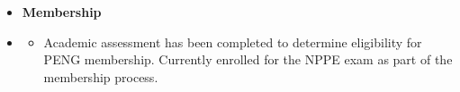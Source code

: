 \begin {itemize} \item [] {\bf \Large    Membership }  \vspace{-1.5em}
\item []  {\bf \hrulefill } \mdseries \normalsize 
    \begin {itemize}
        \item [$\bullet$]  {\normalsize Academic assessment has been completed to determine eligibility for PENG membership. Currently enrolled for the NPPE exam as part of the membership process.}
    \end {itemize}
\end {itemize}

